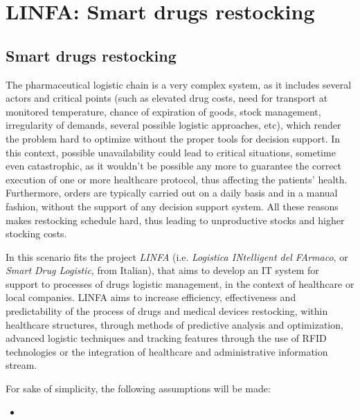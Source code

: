 
\section*{LINFA: Smart drugs restocking}

  \subsection*{Smart drugs restocking}

    The pharmaceutical logistic chain is a very complex system, as it includes several actors and critical points (such as elevated drug costs, need for transport at monitored temperature, chance of expiration of goods, stock management, irregularity of demands, several possible logistic approaches, etc), which render the problem hard to optimize without the proper tools for decision support. In this context, possible unavailability could lead to critical situations, sometime even catastrophic, as it wouldn't be possible any more to guarantee the correct execution of one or more healthcare protocol, thus affecting the patients' health. Furthermore, orders are typically carried out on a daily basis and in a manual fashion, without the support of any decision support system. All these reasons makes restocking schedule hard, thus leading to unproductive stocks and higher stocking costs.
    
    In this scenario fits the project \textit{LINFA} (i.e. \textit{Logistica INtelligent del FArmaco}, or \textit{Smart Drug Logistic}, from Italian), that aims to develop an IT system for support to processes of drugs logistic management, in the context of healthcare or local companies. LINFA aims to increase efficiency, effectiveness and predictability of the process of drugs and medical devices restocking, within healthcare structures, through methods of predictive analysis and optimization, advanced logistic techniques and tracking features through the use of RFID technologies or the integration of healthcare and administrative information stream.
    
    For sake of simplicity, the following assumptions will be made:
    
    \begin{itemize}
      \item 
    \end{itemize}
